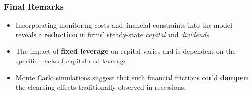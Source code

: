 \documentclass{beamer}
\begin{document}
\begin{frame}
    \frametitle{Final Remarks}
    
    \begin{itemize}
        \setlength\itemsep{1em}
        \setlength\topsep{0pt}
        \setlength\parsep{0pt}
        \item Incorporating monitoring costs and financial constraints into the model reveals a \textbf{reduction} in firms' steady-state \textit{capital} and \textit{dividends}.
        \item The impact of \textbf{fixed leverage} on capital varies and is dependent on the specific levels of capital and leverage.
        \item Monte Carlo simulations suggest that such financial frictions could \textbf{dampen} the cleansing effects traditionally observed in recessions.
    \end{itemize}

\end{frame}
\end{document}
